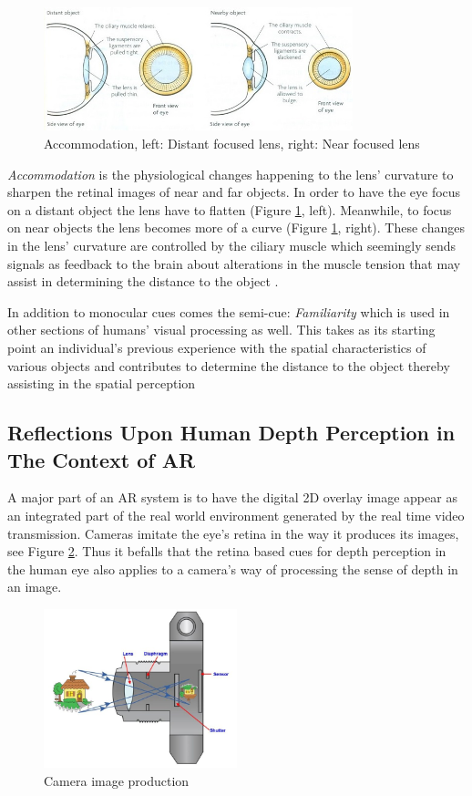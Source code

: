 \begin{figure}[h!]
   \centering
   \includegraphics[width=0.8\textwidth]{figures/cue10.jpg}
   \caption{Accommodation, left: Distant focused lens, right: Near focused lens \cite{Biology2014}}\label{fig:cue10}
\end{figure}

\textit{Accommodation} is the physiological changes happening to the lens’ curvature to sharpen the retinal images of near and far objects. In order to have the eye focus on a distant object the lens have to flatten (Figure \ref{fig:cue10}, left). Meanwhile, to focus on near objects the lens becomes more of a curve (Figure \ref{fig:cue10}, right). These changes in the lens’ curvature are controlled by the ciliary muscle which seemingly sends signals as feedback to the brain about alterations in the muscle tension that may assist in determining the distance to the object \cite{Gale}.

In addition to monocular cues comes the semi-cue: \textit{Familiarity} which is used in other sections of humans’ visual processing as well. This takes as its starting point an individual’s previous experience with the spatial characteristics of various objects and contributes to determine the distance to the object thereby assisting in the spatial perception \cite{Gale}

\subsection{Reflections Upon Human Depth Perception in The Context of AR}
A major part of an AR system is to have the digital 2D overlay image appear as an integrated part of the real world environment generated by the real time video transmission. Cameras imitate the eye’s retina in the way it produces its images, see Figure \ref{fig:camera}. Thus it befalls that the retina based cues for depth perception in the human eye also applies to a camera’s way of processing the sense of depth in an image.

\begin{figure}[h!]
   \centering
   \includegraphics[width=0.5\textwidth]{figures/camera.jpg}
   \caption{Camera image production \cite{Camera}}\label{fig:camera}
\end{figure}

